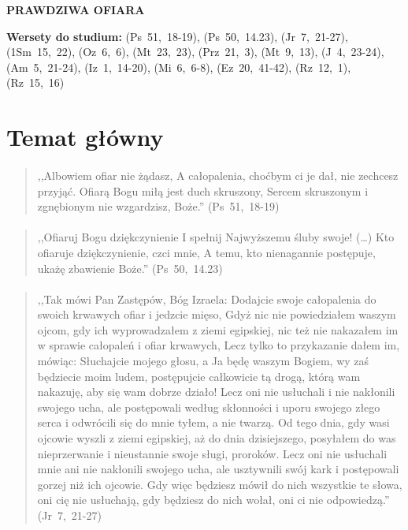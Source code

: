 \documentclass[10pt,a4paper,oneside]{article}
\begin{document}
\centerline{\textbf{\MakeUppercase{Prawdziwa ofiara}}}
\begin{center}
\textbf{Wersety do studium:} 
\mbox{(Ps 51, 18-19)}, \mbox{(Ps 50, 14.23)}, \mbox{(Jr 7, 21-27)}, \mbox{(1Sm 15, 22)}, \mbox{(Oz 6, 6)}, \mbox{(Mt 23, 23)}, \mbox{(Prz 21, 3)}, \mbox{(Mt 9, 13)}, \mbox{(J 4, 23-24)}, \mbox{(Am 5, 21-24)}, \mbox{(Iz 1, 14-20)}, \mbox{(Mi 6, 6-8)}, \mbox{(Ez 20, 41-42)}, \mbox{(Rz 12, 1)}, \mbox{(Rz 15, 16)}
\end{center}
\section{Temat główny}
\paragraph{}
\begin{quote}
,,Albowiem ofiar nie żądasz, A całopalenia, choćbym ci je dał, nie zechcesz przyjąć. Ofiarą Bogu miłą jest duch skruszony, Sercem skruszonym i zgnębionym nie wzgardzisz, Boże.'' \mbox{(Ps 51, 18-19)}
\end{quote}
\paragraph{}
\begin{quote}
,,Ofiaruj Bogu dziękczynienie I spełnij Najwyższemu śluby swoje! (\ldots) Kto ofiaruje dziękczynienie, czci mnie, A temu, kto nienagannie postępuje, ukażę zbawienie Boże.'' \mbox{(Ps 50, 14.23)}
\end{quote}
\paragraph{}
\begin{quote}
,,Tak mówi Pan Zastępów, Bóg Izraela: Dodajcie swoje całopalenia do swoich krwawych ofiar i jedzcie mięso, Gdyż nic nie powiedziałem waszym ojcom, gdy ich wyprowadzałem z ziemi egipskiej, nic też nie nakazałem im w sprawie całopaleń i ofiar krwawych, Lecz tylko to przykazanie dałem im, mówiąc: Słuchajcie mojego głosu, a Ja będę waszym Bogiem, wy zaś będziecie moim ludem, postępujcie całkowicie tą drogą, którą wam nakazuję, aby się wam dobrze działo! Lecz oni nie usłuchali i nie nakłonili swojego ucha, ale postępowali według skłonności i uporu swojego złego serca i odwrócili się do mnie tyłem, a nie twarzą. Od tego dnia, gdy wasi ojcowie wyszli z ziemi egipskiej, aż do dnia dzisiejszego, posyłałem do was nieprzerwanie i nieustannie swoje sługi, proroków. Lecz oni nie usłuchali mnie ani nie nakłonili swojego ucha, ale usztywnili swój kark i postępowali gorzej niż ich ojcowie. Gdy więc będziesz mówił do nich wszystkie te słowa, oni cię nie usłuchają, gdy będziesz do nich wołał, oni ci nie odpowiedzą.'' \mbox{(Jr 7, 21-27)}
\end{quote}
\end{document}
